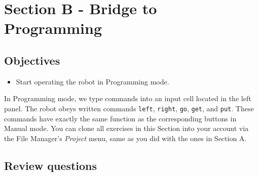 \documentclass[article,A4,12pt]{llncs}
\begin{document}
\section{Section B - Bridge to Programming}

\subsection{Objectives} 
 
\begin{itemize}
\item Start operating the robot in Programming mode.
\end{itemize}
In Programming mode, we type commands into an input cell located in the left panel.
The robot obeys written commands {\tt left}, {\tt right}, {\tt go}, {\tt get}, and {\tt put}.
These commands have exactly the same function as the corresponding buttons in Manual mode.
You can clone all exercises in this Section into your account via the File Manager's {\em Project}
menu, same as you did with the ones in Section A.

\subsection{Review questions}
\end{document}
